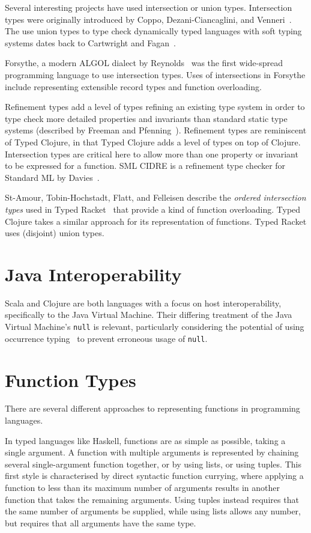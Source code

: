 Several interesting projects have used intersection or union types.
Intersection types were originally introduced by Coppo, Dezani-Ciancaglini, and Venneri~\cite{CDV81}.
The use union types to type check dynamically typed languages with soft typing systems
dates back to Cartwright and Fagan~\cite{CF91}.

Forsythe, a modern ALGOL dialect by Reynolds~\cite{Rey81,Rey96} was the first wide-spread 
programming language to use intersection types.
Uses of intersections in Forsythe include representing extensible record types
and function overloading.

Refinement types add a level of types refining an existing type system
in order to type check more detailed properties and invariants than standard static type systems
(described by Freeman and Pfenning~\cite{FP91}).
Refinement types are reminiscent of Typed Clojure, in that Typed Clojure
adds a level of types on top of Clojure.
Intersection types are critical here to allow more than one property or invariant
to be expressed for a function.
SML CIDRE is a refinement type checker for Standard ML by Davies~\cite{Dav05}.

St-Amour, Tobin-Hochstadt, Flatt, and Felleisen
describe the \emph{ordered intersection types} used in Typed Racket~\cite{St12}
that provide a kind of function overloading.
Typed Clojure takes a similar approach for its representation of functions.
Typed Racket uses (disjoint) union types.

\section{Java Interoperability}

Scala and Clojure are both languages with a focus on host interoperability, specifically
to the Java Virtual Machine. Their differing treatment of the Java Virtual Machine's \lstinline|null| is
relevant, particularly considering the potential of using occurrence typing~\cite{TF10}
to prevent erroneous usage of \lstinline|null|.

\section{Function Types}

There are several different approaches to representing functions in programming languages.

In typed languages like Haskell, functions are as simple as possible, taking a single argument.
A function with multiple arguments is represented by chaining several single-argument function
together, or by using lists, or using tuples. This first style is characterised by direct syntactic function currying, where applying
a function to less than its maximum number of arguments results in another function
that takes the remaining arguments.
Using tuples instead requires that the same number of arguments be supplied,
while using lists allows any number, but requires that all arguments have the same type.

